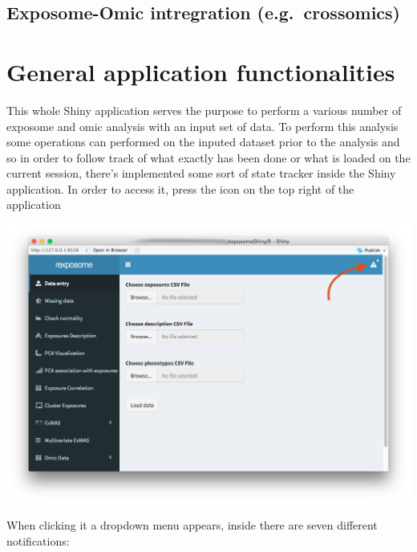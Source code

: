 \documentclass[
]{book}
\begin{document}
\hypertarget{exposome-omic-intregration-e.g.-crossomics}{%
\section{Exposome-Omic intregration (e.g.~crossomics)}\label{exposome-omic-intregration-e.g.-crossomics}}

\hypertarget{general-application-functionalities}{%
\chapter{General application functionalities}\label{general-application-functionalities}}

This whole Shiny application serves the purpose to perform a various number of exposome and omic analysis with an input set of data. To perform this analysis some operations can performed on the inputed dataset prior to the analysis and so in order to follow track of what exactly has been done or what is loaded on the current session, there's implemented some sort of state tracker inside the Shiny application. In order to access it, press the icon on the top right of the application

\includegraphics{images/general1.png}

When clicking it a dropdown menu appears, inside there are seven different notifications:
\end{document}
